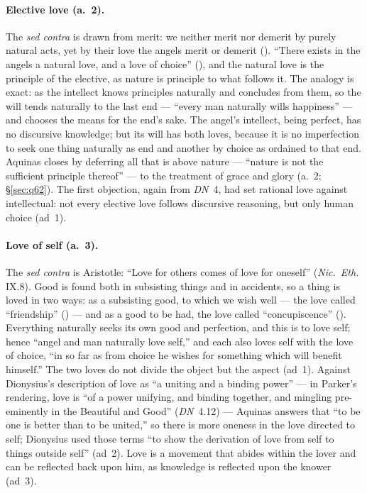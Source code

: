 \paragraph{Elective love (a.~2).} The \emph{sed contra} is drawn from
merit: we neither merit nor demerit by purely natural acts, yet by their
love the angels merit or demerit (). ``There exists in the angels a natural love, and a
love of choice'' (), and the natural love is
the principle of the elective, as nature is principle to what follows
it. The analogy is exact: as the intellect knows principles naturally
and concludes from them, so the will tends naturally to the last end ---
``every man naturally wills happiness'' --- and chooses the means for
the end's sake. The angel's intellect, being perfect, has no discursive
knowledge; but its will has both loves, because it is no imperfection to
seek one thing naturally as end and another by choice as ordained to
that end. Aquinas closes by deferring all that is above nature ---
``nature is not the sufficient principle thereof'' --- to the treatment
of grace and glory (a.~2; \S\ref{sec:q62}). The first objection, again
from \emph{DN}~4, had set rational love against intellectual: not every
elective love follows discursive reasoning, but only human choice
(ad~1).

\paragraph{Love of self (a.~3).} The \emph{sed contra} is Aristotle:
``Love for others comes of love for oneself'' (\emph{Nic.\ Eth.} IX.8).
Good is found both in subsisting things and in accidents, so a thing is
loved in two ways: as a subsisting good, to which we wish well --- the
love called ``friendship'' () --- and as a good to
be had, the love called ``concupiscence'' (). Everything naturally seeks its own good and
perfection, and this is to love self; hence ``angel and man naturally
love self,'' and each also loves self with the love of choice, ``in so
far as from choice he wishes for something which will benefit himself.''
The two loves do not divide the object but the aspect (ad~1). Against
Dionysius's description of love as ``a uniting and a binding power'' ---
in Parker's rendering, love is ``of a power unifying, and binding
together, and mingling pre-eminently in the Beautiful and Good''
(\emph{DN}~4.12) --- Aquinas answers that ``to be one is better than to
be united,'' so there is more oneness in the love directed to self;
Dionysius used those terms ``to show the derivation of love from self
to things outside self'' (ad~2). Love is a movement that abides within
the lover and can be reflected back upon him, as knowledge is reflected
upon the knower (ad~3).

